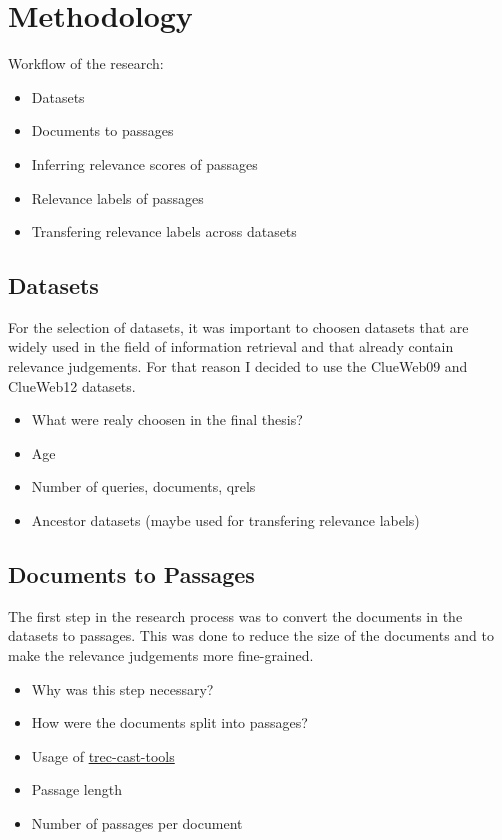 \chapter{Methodology}\label{methodology}

Workflow of the research:
\begin{itemize}
    \item Datasets
    \item Documents to passages
    \item Inferring relevance scores of passages
    \item Relevance labels of passages
    \item Transfering relevance labels across datasets
\end{itemize}

\section{Datasets}\label{datasets}

For the selection of datasets, it was important to choosen datasets that are widely used in the field of information retrieval and that already contain relevance judgements. For that reason I decided to use the ClueWeb09 and ClueWeb12 datasets.

\begin{itemize}
    \item What were realy choosen in the final thesis?
    \item Age
    \item Number of queries, documents, qrels
    \item Ancestor datasets (maybe used for transfering relevance labels)
\end{itemize}

\section{Documents to Passages}\label{documents-to-passages}

The first step in the research process was to convert the documents in the datasets to passages. This was done to reduce the size of the documents and to make the relevance judgements more fine-grained.

\begin{itemize}
    \item Why was this step necessary?
    \item How were the documents split into passages?
    \item Usage of \href{https://github.com/grill-lab/trec-cast-tools/tree/master/corpus_processing/passage_chunkers}{trec-cast-tools}
    \item Passage length
    \item Number of passages per document
\end{itemize}

